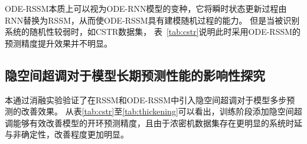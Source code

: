 ODE-RSSM本质上可以视为ODE-RNN模型的变种，它将瞬时状态更新过程由RNN替换为RSSM，从而使ODE-RSSM具有建模随机过程的能力。
但是当被识别系统的随机性较弱时，如CSTR数据集， 表~\ref{tab:cstr}说明此时采用ODE-RSSM的预测精度提升效果并不明显。


\subsection{隐空间超调对于模型长期预测性能的影响性探究}
本通过消融实验验证了在RSSM和ODE-RSSM中引入隐空间超调对于模型多步预测的改善效果。
从表\ref{tab:cstr}至\ref{tab:thickening}可以看出，训练阶段添加隐空间超调能够有效改善模型的开环预测精度，且由于浓密机数据集存在更明显的系统时延与非确定性，改善程度更加明显。

